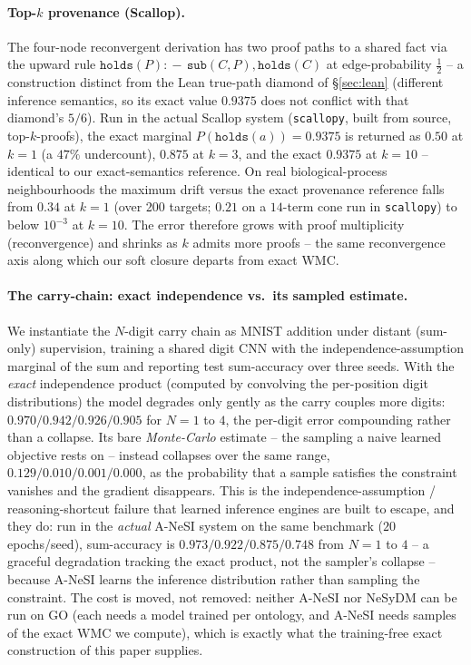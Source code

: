 \documentclass[anon]{nesy2026}
\newcommand{\WMC}{\ensuremath{\mathrm{WMC}}}
\begin{document}
\paragraph{Top-$k$ provenance (Scallop).}
The four-node reconvergent derivation has two proof paths to a shared fact via the upward rule $\texttt{holds}(P)\!:\!-\,\texttt{sub}(C,P),\texttt{holds}(C)$ at edge-probability $\tfrac12$ -- a construction distinct from the Lean true-path diamond of \S\ref{sec:lean} (different inference semantics, so its exact value $0.9375$ does not conflict with that diamond's $5/6$). Run in the actual Scallop system (\texttt{scallopy}, built from source, top-$k$-proofs), the exact marginal $P(\texttt{holds}(a))=0.9375$ is returned as $0.50$ at $k{=}1$ (a $47\%$ undercount), $0.875$ at $k{=}3$, and the exact $0.9375$ at $k{=}10$ -- identical to our exact-semantics reference. On real biological-process neighbourhoods the maximum drift versus the exact provenance reference falls from $0.34$ at $k{=}1$ (over 200 targets; $0.21$ on a $14$-term cone run in \texttt{scallopy}) to below $10^{-3}$ at $k{=}10$. The error therefore grows with proof multiplicity (reconvergence) and shrinks as $k$ admits more proofs -- the same reconvergence axis along which our soft closure departs from exact $\WMC$.

\paragraph{The carry-chain: exact independence vs.\ its sampled estimate.}
We instantiate the $N$-digit carry chain as MNIST addition under distant (sum-only) supervision,
training a shared digit CNN with the independence-assumption marginal of the sum and reporting
test sum-accuracy over three seeds. With the \emph{exact} independence product (computed by
convolving the per-position digit distributions) the model degrades only gently as the carry
couples more digits: $0.970/0.942/0.926/0.905$ for $N{=}1$ to $4$, the per-digit error
compounding rather than a collapse. Its bare \emph{Monte-Carlo} estimate -- the sampling a naive
learned objective rests on -- instead collapses over the same range, $0.129/0.010/0.001/0.000$,
as the probability that a sample satisfies the constraint vanishes and the gradient disappears.
This is the independence-assumption / reasoning-shortcut failure
\citep{vankrieken2024independence,marconato2023reasoningshortcuts} that learned inference engines
are built to escape, and they do: run in the \emph{actual} A-NeSI system on the same benchmark
($20$ epochs/seed), sum-accuracy is $0.973/0.922/0.875/0.748$ from $N{=}1$ to $4$ -- a graceful
degradation tracking the exact product, not the sampler's collapse -- because A-NeSI learns the
inference distribution rather than sampling the constraint. The cost is moved, not removed: neither
A-NeSI nor NeSyDM \citep{vankrieken2025nesydm} can be run on GO (each needs a model trained per
ontology, and A-NeSI needs samples of the exact $\WMC$ we compute), which is exactly what the
training-free exact construction of this paper supplies.
\end{document}
